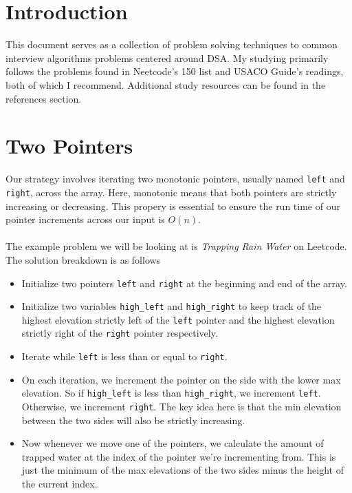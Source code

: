 \section{Introduction}
This document serves as a collection of problem solving techniques to common interview algorithms problems centered around DSA. 
My studying primarily follows the problems found in Neetcode's 150 list and USACO Guide's readings, both of which I recommend. 
Additional study resources can be found in the references section.

\section{Two Pointers}
Our strategy involves iterating two monotonic pointers, usually named \texttt{left} and \texttt{right}, across the array. Here, monotonic
means that both pointers are strictly increasing or decreasing. This propery is essential to ensure the run time of our pointer increments
across our input is $O(n)$.\\
\\
The example problem we will be looking at is \textit{Trapping Rain Water} on Leetcode. The solution breakdown is as follows
\begin{itemize} 
    \item Initialize two pointers \texttt{left} and \texttt{right} at the beginning and end of the array. 
    \item Initialize two variables \texttt{high\_left} and \texttt{high\_right} to keep track of the highest elevation strictly left of the \texttt{left} pointer and the highest elevation strictly right of the \texttt{right} pointer respectively.
    \item Iterate while \texttt{left} is less than or equal to \texttt{right}.
    \item On each iteration, we increment the pointer on the side with the lower max elevation. So if \texttt{high\_left} is less than \texttt{high\_right}, we increment \texttt{left}. Otherwise, we increment \texttt{right}. The key idea here is 
          that the min elevation between the two sides will also be strictly increasing.
    \item Now whenever we move one of the pointers, we calculate the amount of trapped water at the index of the pointer we're incrementing from. This is just the minimum of the max elevations of the two sides minus the height of the current index.
\end{itemize}

